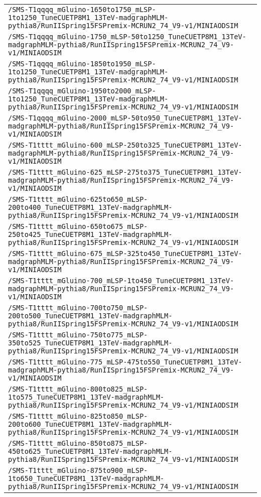 \begin{center}
\begin{tabular}{l}
\verb!/SMS-T1qqqq_mGluino-1650to1750_mLSP-1to1250_TuneCUETP8M1_13TeV-madgraphMLM-pythia8/RunIISpring15FSPremix-MCRUN2_74_V9-v1/MINIAODSIM! \tabularnewline
\verb!/SMS-T1qqqq_mGluino-1750_mLSP-50to1250_TuneCUETP8M1_13TeV-madgraphMLM-pythia8/RunIISpring15FSPremix-MCRUN2_74_V9-v1/MINIAODSIM! \tabularnewline
\verb!/SMS-T1qqqq_mGluino-1850to1950_mLSP-1to1250_TuneCUETP8M1_13TeV-madgraphMLM-pythia8/RunIISpring15FSPremix-MCRUN2_74_V9-v1/MINIAODSIM! \tabularnewline
\verb!/SMS-T1qqqq_mGluino-1950to2000_mLSP-1to1250_TuneCUETP8M1_13TeV-madgraphMLM-pythia8/RunIISpring15FSPremix-MCRUN2_74_V9-v1/MINIAODSIM! \tabularnewline
\verb!/SMS-T1qqqq_mGluino-2000_mLSP-50to950_TuneCUETP8M1_13TeV-madgraphMLM-pythia8/RunIISpring15FSPremix-MCRUN2_74_V9-v1/MINIAODSIM! \tabularnewline
\verb!/SMS-T1tttt_mGluino-600_mLSP-250to325_TuneCUETP8M1_13TeV-madgraphMLM-pythia8/RunIISpring15FSPremix-MCRUN2_74_V9-v1/MINIAODSIM! \tabularnewline
\verb!/SMS-T1tttt_mGluino-625_mLSP-275to375_TuneCUETP8M1_13TeV-madgraphMLM-pythia8/RunIISpring15FSPremix-MCRUN2_74_V9-v1/MINIAODSIM! \tabularnewline
\verb!/SMS-T1tttt_mGluino-625to650_mLSP-200to400_TuneCUETP8M1_13TeV-madgraphMLM-pythia8/RunIISpring15FSPremix-MCRUN2_74_V9-v1/MINIAODSIM! \tabularnewline
\verb!/SMS-T1tttt_mGluino-650to675_mLSP-250to425_TuneCUETP8M1_13TeV-madgraphMLM-pythia8/RunIISpring15FSPremix-MCRUN2_74_V9-v1/MINIAODSIM! \tabularnewline
\verb!/SMS-T1tttt_mGluino-675_mLSP-325to450_TuneCUETP8M1_13TeV-madgraphMLM-pythia8/RunIISpring15FSPremix-MCRUN2_74_V9-v1/MINIAODSIM! \tabularnewline
\verb!/SMS-T1tttt_mGluino-700_mLSP-1to450_TuneCUETP8M1_13TeV-madgraphMLM-pythia8/RunIISpring15FSPremix-MCRUN2_74_V9-v1/MINIAODSIM! \tabularnewline
\verb!/SMS-T1tttt_mGluino-700to750_mLSP-200to500_TuneCUETP8M1_13TeV-madgraphMLM-pythia8/RunIISpring15FSPremix-MCRUN2_74_V9-v1/MINIAODSIM! \tabularnewline
\verb!/SMS-T1tttt_mGluino-750to775_mLSP-350to525_TuneCUETP8M1_13TeV-madgraphMLM-pythia8/RunIISpring15FSPremix-MCRUN2_74_V9-v1/MINIAODSIM! \tabularnewline
\verb!/SMS-T1tttt_mGluino-775_mLSP-475to550_TuneCUETP8M1_13TeV-madgraphMLM-pythia8/RunIISpring15FSPremix-MCRUN2_74_V9-v1/MINIAODSIM! \tabularnewline
\verb!/SMS-T1tttt_mGluino-800to825_mLSP-1to575_TuneCUETP8M1_13TeV-madgraphMLM-pythia8/RunIISpring15FSPremix-MCRUN2_74_V9-v1/MINIAODSIM! \tabularnewline
\verb!/SMS-T1tttt_mGluino-825to850_mLSP-200to600_TuneCUETP8M1_13TeV-madgraphMLM-pythia8/RunIISpring15FSPremix-MCRUN2_74_V9-v1/MINIAODSIM! \tabularnewline
\verb!/SMS-T1tttt_mGluino-850to875_mLSP-450to625_TuneCUETP8M1_13TeV-madgraphMLM-pythia8/RunIISpring15FSPremix-MCRUN2_74_V9-v1/MINIAODSIM! \tabularnewline
\verb!/SMS-T1tttt_mGluino-875to900_mLSP-1to650_TuneCUETP8M1_13TeV-madgraphMLM-pythia8/RunIISpring15FSPremix-MCRUN2_74_V9-v1/MINIAODSIM! \tabularnewline

\end{tabular}
\end{center}
